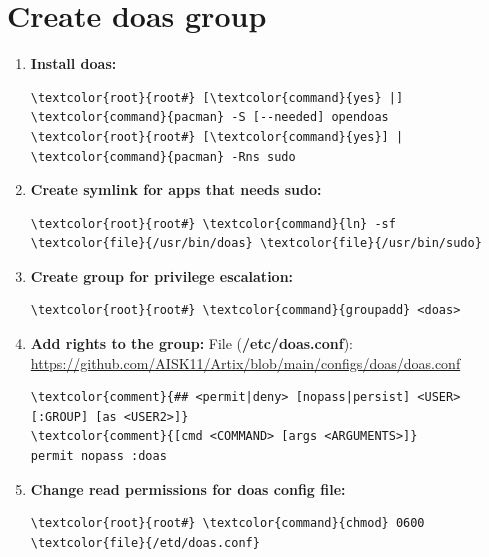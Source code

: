 \documentclass[10pt, a4paper, onecolumn, oneside, titlepage, openany]{book}
\begin{document}
\section{Create doas group}
\begin{enumerate}
    \item \textbf{Install doas:}
\begin{Verbatim}[commandchars=\\\{\}]
\textcolor{root}{root#} [\textcolor{command}{yes} |] \textcolor{command}{pacman} -S [--needed] opendoas
\textcolor{root}{root#} [\textcolor{command}{yes}] | \textcolor{command}{pacman} -Rns sudo
\end{Verbatim}
    \item \textbf{Create symlink for apps that needs sudo:}
\begin{Verbatim}[commandchars=\\\{\}]
\textcolor{root}{root#} \textcolor{command}{ln} -sf \textcolor{file}{/usr/bin/doas} \textcolor{file}{/usr/bin/sudo}
\end{Verbatim}
    \item \textbf{Create group for privilege escalation:}
\begin{Verbatim}[commandchars=\\\{\}]
\textcolor{root}{root#} \textcolor{command}{groupadd} <doas>
\end{Verbatim}
    \item \textbf{Add rights to the group:}
\newline File (\textbf{\textcolor{file}{/etc/doas.conf}}):
\newline \url{https://github.com/AISK11/Artix/blob/main/configs/doas/doas.conf}
\begin{Verbatim}[commandchars=\\\{\}]
\textcolor{comment}{## <permit|deny> [nopass|persist] <USER>[:GROUP] [as <USER2>]}
\textcolor{comment}{[cmd <COMMAND> [args <ARGUMENTS>]}
permit nopass :doas
\end{Verbatim}
    \item \textbf{Change read permissions for doas config file:}
\begin{Verbatim}[commandchars=\\\{\}]
\textcolor{root}{root#} \textcolor{command}{chmod} 0600 \textcolor{file}{/etd/doas.conf}
\end{Verbatim}
\end{enumerate}
\end{document}
